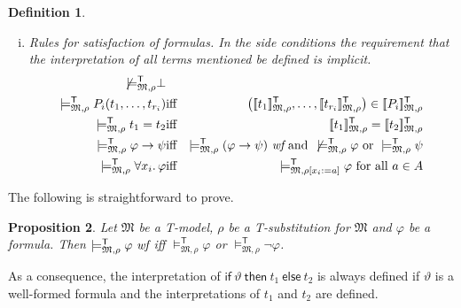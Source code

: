 \documentclass{article}
\newtheorem{definition}{Definition}[section]
\newtheorem{proposition}[definition]{Proposition}
\newcommand{\T}{\textsf T}
\newcommand{\ifthelse}[3]{\ensuremath{\mathsf{if}\ {#1}\ \mathsf{then}\ {#2}\ \mathsf{else}\ {#3}}}
\newcommand{\wf}{\ \mbox{\em wf}}
\newcommand{\ints}[4]{\ensuremath{[\![{#4}]\!]^{\mathsf{#1}}_{\mathfrak{#2},{#3}}}}
\newcommand{\mymodelss}[3]{\ensuremath{\models_{\mathfrak{#2},{#3}}^{\mathsf{#1}}}}
\def\sep{.\,}
\begin{document}
\begin{definition}
\begin{enumerate}[(i)]
\begin{eqnarray*}
\mymodelss{T}M\rho\bot\wf \\
\mymodelss{T}M\rho P_i(t_1,\ldots,t_{r_i})\wf & \mbox{iff} &
 \mymodelss{T}M\rho{t_1}\wf,\ldots,\mymodelss{T}M\rho{t_{r_i}}\wf \\
\mymodelss{T}M\rho t_1=t_2\wf & \mbox{iff} &
 \mymodelss{T}M\rho{t_1}\wf\mbox{ and }\mymodelss{T}M\rho{t_2}\wf \\
\mymodelss{T}M\rho(\varphi\to\psi)\wf & \mbox{iff} &
 \mymodelss{T}M\rho\varphi\wf\mbox{ and } \mymodelss{T}M\rho\psi\wf \\
\mymodelss{T}M\rho(\forall x_i\sep\varphi)\wf & \mbox{iff} &
 \mymodelss{T}M{\rho[x_i:=a]}\varphi\wf \mbox{ for all $a\in A$}
\end{eqnarray*}
\item Rules for satisfaction of formulas.  In the side conditions the
requirement that the interpretation of all terms mentioned be defined
is implicit.
\begin{eqnarray*}
\not\!{\mymodelss{T}M\rho}\bot \\
\mymodelss{T}M\rho P_i(t_1,\ldots,t_{r_i}) & \mbox{iff} &
 \left(\ints{T}M\rho{t_1},\ldots,\ints{T}M\rho{t_{r_i}}\right)
  \in\ints{T}M\rho{P_i} \\
\mymodelss{T}M\rho t_1=t_2 & \mbox{iff} &
 \ints{T}M\rho{t_1}=\ints{T}M\rho{t_2} \\
\mymodelss{T}M\rho\varphi\to\psi & \mbox{iff} &
 \mymodelss{T}M\rho(\varphi\to\psi)\wf \mbox{ and }
 \not\!{\mymodelss{T}M\rho\varphi} \mbox{ or } \mymodelss{T}M\rho\psi \\
\mymodelss{T}M\rho\forall x_i\sep\varphi & \mbox{iff} &
 \mymodelss{T}M{\rho[x_i:=a]}\varphi \mbox{ for all $a\in A$}
\end{eqnarray*}
\end{enumerate}
\end{definition}

The following is straightforward to prove.
\begin{proposition}\label{modelTwf}
Let $\mathfrak M$ be a {\T}-model, $\rho$ be a {\T}-substitution for
$\mathfrak M$ and $\varphi$ be a formula.
Then $\mymodelss{T}M\rho\varphi\wf$ iff $\mymodelss{T}M\rho\varphi$ or
$\mymodelss{T}M\rho\neg\varphi$.
\end{proposition}

As a consequence, the interpretation of $\ifthelse\vartheta{t_1}{t_2}$
is always defined if $\vartheta$ is a well-formed formula and the
interpretations of $t_1$ and $t_2$ are defined.
\end{document}
